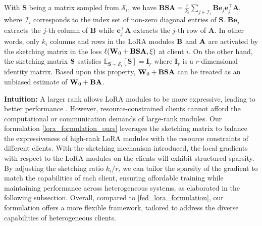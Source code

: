 \documentclass{article} %
\theoremstyle{plain}
\theoremstyle{definition}
\begin{document}
With \(\mathbf{S}\) being a matrix sampled from \(\mathcal{S}_i\), we have $
   \mathbf{BSA} = \frac{r}{k_i} \sum_{j \in \mathcal{I}_i} \mathbf{B} \mathbf{e}_j \mathbf{e}_j^\top \mathbf{A},
   $
where \(\mathcal{I}_i\) corresponds to the index set of non-zero diagonal entries of \(\mathbf{S}\). \(\mathbf{B} \mathbf{e}_j\) extracts the \( j \)-th column of \(\mathbf{B}\) while \(\mathbf{e}_j^\top \mathbf{A}\) extracts the \( j \)-th row of \(\mathbf{A}\). In other words, only \(k_i\) columns and rows in the LoRA modules \(\bf B\) and \(\bf A\) are activated by the sketching matrix in the loss \(\ell ({\bf W}_{0} + {\bf B}\bf S{\bf A}, \xi)\) at client \(i\).  On the other hand, the sketching matrix \(\bf S\) satisfies \(\mathbb{E}_{\mathbf{S} \sim \mathcal{S}_i}[\mathbf{S}] = \mathbf{I}_r\) where $\mathbf{I}_r$ is a $r$-dimensional identity matrix. Based upon this property, ${\bf W}_0 + {\bf B} {\bf S} {\bf A}$ can be treated as an unbiased estimate of ${\bf W}_0 + \bf B{\bf A}$. 
%
%

\textbf{Intuition:} A larger rank allows LoRA modules to be more expressive, leading to better performance \citep{bai2024federatedfinetuninglargelanguage,kalajdzievski2023rankstabilizationscalingfactor,shuttleworth2024lora}. However, resource-constrained clients cannot afford the computational or communication demands of large-rank modules. Our formulation \eqref{lora_formulation_ours} leverages the sketching matrix to balance the expressiveness of high-rank LoRA modules with the resource constraints of different clients. With the sketching mechanism introduced, the local gradients with respect to the LoRA modules on the clients will exhibit structured sparsity. By adjusting the sketching ratio \(k_i/r\), we can tailor the sparsity of the gradient to match the capabilities of each client, ensuring affordable training while maintaining performance across heterogeneous systems, as elaborated in the following subsection. Overall, compared to \eqref{fed_lora_formulation}, our formulation offers a more flexible framework, tailored to address the diverse capabilities of heterogeneous clients.
\end{document}

